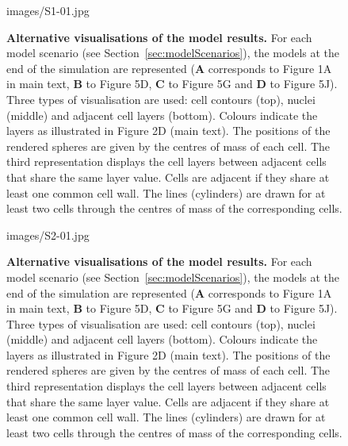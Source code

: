 \setcounter{figure}{0}
\makeatletter 
\renewcommand{\figurename}{Figure}
\addto\captionsenglish{\renewcommand{\figurename}{Figure}}
\renewcommand{\thefigure}{S\@arabic\c@figure}
\makeatother
%
\begin{figure}[htbp]
\centering
	\begin{overpic}[width=0.85\linewidth]{images/S1-01.jpg}
	\end{overpic}
\caption[Alternative visualisations of the model results.]
{{\bf Alternative visualisations of the model results.} For each model scenario (see Section~\ref{sec:modelScenarios}), the models at the end of the simulation are represented (\textbf{A} corresponds to Figure 1A in main text, \textbf{B} to Figure 5D, \textbf{C} to Figure 5G and \textbf{D} to Figure 5J). Three types of visualisation are used: cell contours (top), nuclei (middle) and adjacent cell layers (bottom). Colours indicate the layers as illustrated in Figure 2D (main text). The positions of the rendered spheres are given by the centres of mass of each cell. The third representation displays the cell layers between adjacent cells that share the same layer value. Cells are adjacent if they share at least one common cell wall. The lines (cylinders) are drawn for at least two cells through the centres of mass of the corresponding cells.
}
\label{fig:S1}
\end{figure}
%
\clearpage
%
\begin{figure}[htbp]
\centering
	\begin{overpic}[width=0.8\linewidth]{images/S2-01.jpg}
	\end{overpic}
\caption[Alternative visualisations of the model results.]
{{\bf Alternative visualisations of the model results.} For each model scenario (see Section~\ref{sec:modelScenarios}), the models at the end of the simulation are represented (\textbf{A} corresponds to Figure 1A in main text, \textbf{B} to Figure 5D, \textbf{C} to Figure 5G and \textbf{D} to Figure 5J). Three types of visualisation are used: cell contours (top), nuclei (middle) and adjacent cell layers (bottom). Colours indicate the layers as illustrated in Figure 2D (main text). The positions of the rendered spheres are given by the centres of mass of each cell. The third representation displays the cell layers between adjacent cells that share the same layer value. Cells are adjacent if they share at least one common cell wall. The lines (cylinders) are drawn for at least two cells through the centres of mass of the corresponding cells.
}
\label{fig:S2}
\end{figure}
